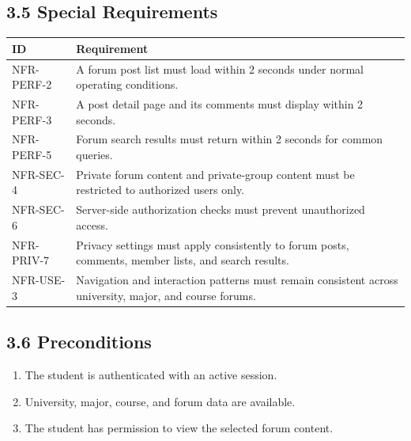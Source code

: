 \documentclass[12pt]{article}
\renewcommand{\baselinestretch}{1.5}
\begin{document}
\subsection*{3.5 Special Requirements}
\par\medskip
\begingroup
\small
\renewcommand{\baselinestretch}{1.0}\selectfont
\renewcommand{\arraystretch}{1.15}
\setlength{\tabcolsep}{6pt}
\begin{longtable}{|>{\raggedright\arraybackslash}p{}|>{\raggedright\arraybackslash}p{}|}
\hline
\textbf{ID} & \textbf{Requirement} \\ \hline
\endhead
NFR-PERF-2 & A forum post list must load within 2 seconds under normal operating conditions. \\ \hline
NFR-PERF-3 & A post detail page and its comments must display within 2 seconds. \\ \hline
NFR-PERF-5 & Forum search results must return within 2 seconds for common queries. \\ \hline
NFR-SEC-4 & Private forum content and private-group content must be restricted to authorized users only. \\ \hline
NFR-SEC-6 & Server-side authorization checks must prevent unauthorized access. \\ \hline
NFR-PRIV-7 & Privacy settings must apply consistently to forum posts, comments, member lists, and search results. \\ \hline
NFR-USE-3 & Navigation and interaction patterns must remain consistent across university, major, and course forums. \\ \hline
\end{longtable}
\endgroup
\par\medskip
\hypertarget{sec:3-6-preconditions}{}
\subsection*{3.6 Preconditions}
\par\medskip
\begin{enumerate}
\item The student is authenticated with an active session.
\item University, major, course, and forum data are available.
\item The student has permission to view the selected forum content.
\end{enumerate}
\par\medskip
\hypertarget{sec:3-7-postconditions}{}
\end{document}
